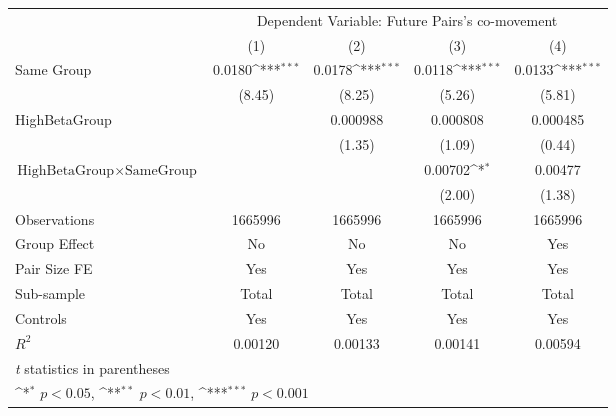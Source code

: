 {
\def\sym#1{\ifmmode^{#1}\else\(^{#1}\)\fi}
\begin{tabular}{l*{4}{c}}
\hline\hline
                &\multicolumn{4}{c}{Dependent Variable: Future Pairs's co-movement}         \\\cmidrule(lr){2-5}
                &\multicolumn{1}{c}{(1)}         &\multicolumn{1}{c}{(2)}         &\multicolumn{1}{c}{(3)}         &\multicolumn{1}{c}{(4)}         \\
\hline
Same Group      &   0.0180\sym{***}&   0.0178\sym{***}&   0.0118\sym{***}&   0.0133\sym{***}\\
                &   (8.45)         &   (8.25)         &   (5.26)         &   (5.81)         \\
[1em]
HighBetaGroup   &                  & 0.000988         & 0.000808         & 0.000485         \\
                &                  &   (1.35)         &   (1.09)         &   (0.44)         \\
[1em]
$ {\text{HighBetaGroup} } \times {\text{SameGroup} }  $ &                  &                  &  0.00702\sym{*}  &  0.00477         \\
                &                  &                  &   (2.00)         &   (1.38)         \\
\hline
Observations    &  1665996         &  1665996         &  1665996         &  1665996         \\
Group Effect    &       No         &       No         &       No         &      Yes         \\
Pair Size FE    &      Yes         &      Yes         &      Yes         &      Yes         \\
Sub-sample      &    Total         &    Total         &    Total         &    Total         \\
Controls        &      Yes         &      Yes         &      Yes         &      Yes         \\
$ R^2 $         &  0.00120         &  0.00133         &  0.00141         &  0.00594         \\
\hline\hline
\multicolumn{5}{l}{\footnotesize \textit{t} statistics in parentheses}\\
\multicolumn{5}{l}{\footnotesize \sym{*} \(p<0.05\), \sym{**} \(p<0.01\), \sym{***} \(p<0.001\)}\\
\end{tabular}
}
